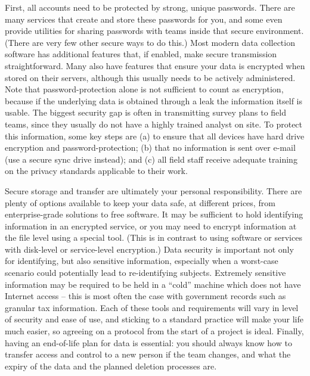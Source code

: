 First, all accounts need to be protected by strong, unique passwords.
There are many services that create and store these passwords for you,
and some even provide utilities for sharing passwords with teams
inside that secure environment. (There are very few other secure ways to do this.)
Most modern data collection software has additional features that, if enabled, make secure transmission straightforward.
Many also have features that ensure your data is encrypted when stored on their servers,
although this usually needs to be actively administered.
Note that password-protection alone is not sufficient to count as encryption,
because if the underlying data is obtained through a leak the information itself is usable.
The biggest security gap is often in transmitting survey plans to field teams,
since they usually do not have a highly trained analyst on site.
To protect this information, some key steps are
(a) to ensure that all devices have hard drive encryption and password-protection;
(b) that no information is sent over e-mail (use a secure sync drive instead);
and (c) all field staff receive adequate training on the privacy standards applicable to their work.

Secure storage and transfer are ultimately your personal responsibility.
There are plenty of options available to keep your data safe,
at different prices, from enterprise-grade solutions to free software.
It may be sufficient to hold identifying information in an encrypted service,
or you may need to encrypt information at the file level using a special tool.
(This is in contrast to using software or services with disk-level or service-level encryption.)
Data security is important not only for identifying, but also sensitive information,
especially when a worst-case scenario could potentially lead to re-identifying subjects.
Extremely sensitive information may be required to be held in a ``cold'' machine
which does not have Internet access -- this is most often the case with
government records such as granular tax information.
Each of these tools and requirements will vary in level of security and ease of use,
and sticking to a standard practice will make your life much easier,
so agreeing on a protocol from the start of a project is ideal.
Finally, having an end-of-life plan for data is essential:
you should always know how to transfer access and control to a new person if the team changes,
and what the expiry of the data and the planned deletion processes are.

